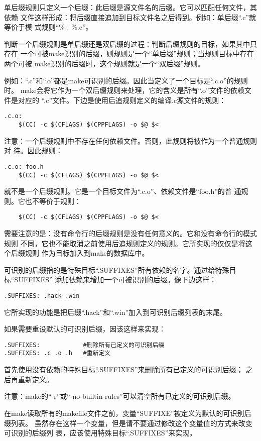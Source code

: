 单后缀规则只定义一个后缀：此后缀是源文件名的后缀。它可以匹配任何文件，其依赖
文件这样形成：将后缀直接追加到目标文件名之后得到。例如：单后缀“.c”就等价于模
式规则“\% : \%.c”。

判断一个后缀规则是单后缀还是双后缀的过程：判断后缀规则的目标，如果其中只存在
一个可被make识别的后缀，则规则是一个“单后缀”规则；当规则目标中存在两个可被
make识别的后缀时，这个规则就是一个“双后缀”规则。

例如：“.c”和“.o”都是make可识别的后缀。因此当定义了一个目标是“.c.o”的规则时。
make会将它作为一个双后缀规则来处理，它的含义是所有“.o”文件的依赖文件是对应的
“.c”文件。下边是使用后追规则定义的编译.c源文件的规则：

\begin{Verbatim}[]
.c.o:
    $(CC) -c $(CFLAGS) $(CPPFLAGS) -o $@ $<
\end{Verbatim}

注意：一个后缀规则中不存在任何依赖文件。否则，此规则将被作为一个普通规则对
待。因此规则：
\begin{Verbatim}[]
.c.o: foo.h
    $(CC) -c $(CFLAGS) $(CPPFLAGS) -o $@ $<
\end{Verbatim}
\noindent 就不是一个后缀规则。它是一个目标文件为“.c.o”、依赖文件是“foo.h”的普
通规则。它也不等价于规则：
\begin{Verbatim}[]
%.o: %.c foo.h
    $(CC) -c $(CFLAGS) $(CPPFLAGS) -o $@ $<
\end{Verbatim}

需要注意的是：没有命令行的后缀规则是没有任何意义的。它和没有命令行的模式规则
不同，它也不能取消之前使用后追规则定义的规则。它所实现的仅仅是将这个后缀规则
作为目标加入到make的数据库中。

可识别的后缀指的是特殊目标“.SUFFIXES”所有依赖的名字。通过给特殊目标“SUFFIXES”
添加依赖来增加一个可被识别的后缀。像下边这样：
\begin{Verbatim}[]
.SUFFIXES: .hack .win
\end{Verbatim}
\noindent 它所实现的功能是把后缀“.hack”和“.win”加入到可识别后缀列表的末尾。

如果需要重设默认的可识别后缀，因该这样来实现：
\begin{Verbatim}[]
.SUFFIXES:            #删除所有已定义的可识别后缀
.SUFFIXES: .c .o .h   #重新定义
\end{Verbatim}
\noindent 首先使用没有依赖的特殊目标“.SUFFIXES”来删除所有已定义的可识别后缀；
之后再重新定义。

注意：make的“-r”或“-no-builtin-rules”可以清空所有已定义的可识别后缀。

在make读取所有的makefile文件之前，变量“SUFFIXE”被定义为默认的可识别后缀列表。
虽然存在这样一个变量，但是请不要通过修改这个变量值的方式来改变可识别的后缀列
表，应该使用特殊目标“.SUFFIXES”来实现。

